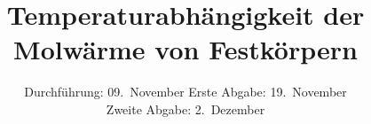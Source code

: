 ﻿

\subject{Fortgeschrittenen Praktikum WS 15/16 - V47}
\title{Temperaturabhängigkeit der Molwärme von
Festkörpern}

\date{
	Durchführung: 09.~November 
	Erste Abgabe: 19.~November\\
	Zweite Abgabe: 2.~Dezember
}



\maketitle
\thispagestyle{empty}
\tableofcontents
\newpage






\nocite{uncertainties}
\nocite{numpy}
\nocite{scipy}
\nocite{matplotlib}
\printbibliography%


